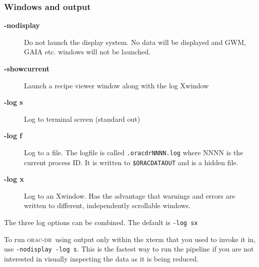 \documentclass[twoside,11pt]{article}
\renewcommand{\_}{\texttt{\symbol{95}}}
\newcommand{\oracdr}{\textsc{orac-dr}}
\begin{document}
\subsubsection*{Windows and output\label{oracdr_Windows_and_output}}\begin{description}
\item[\textbf{-nodisplay}] \mbox{}

Do not launch the display system. No data will be displayed and GWM,
GAIA etc. windows will not be launched.

\item[\textbf{-showcurrent}] \mbox{}

Launch a recipe viewer window along with the log Xwindow

\item[\textbf{-log s}] \mbox{}

Log to terminal screen (standard out)

\item[\textbf{-log f}] \mbox{}

Log to a file. The logfile is called \texttt{.oracdr\_NNNN.log} where NNNN 
is the current process ID. It is written to \texttt{\$ORAC\_DATA\_OUT} and is 
a hidden file.

\item[\textbf{-log x}] \mbox{}

Log to an Xwindow. Has the advantage that warnings and errors are
written to different, independently scrollable windows.

\end{description}


The three log options can be combined. The default is \texttt{-log sx}



To run \oracdr\ using output only within the xterm that you used
to invoke it in, use \texttt{-nodisplay -log s}. This is the fastest way
to run the pipeline if you are not interested in visually
inspecting the data as it is being reduced.
\end{document}
